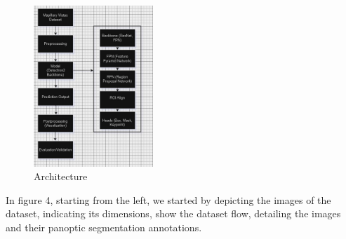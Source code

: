\documentclass[conference]{IEEEtran}
\begin{document}
\begin{figure}[htbp]
    \centering
    \includegraphics[width=0.40\textwidth]{projarch.jpg}
    \caption{Architecture}
    \label{fig}
\end{figure}
In figure 4, starting from the left, we started by depicting the images of the dataset, indicating its dimensions, show the dataset flow, detailing the images and their panoptic segmentation annotations.
\end{document}
